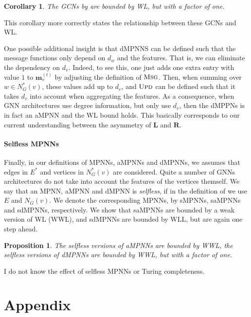 \documentclass[10pt,a4paper]{article}
\newtheorem{proposition}{Proposition}[section]
\newtheorem{corollary}[theorem]{Corollary}
\theoremstyle{definition}
\begin{document}
\begin{corollary}
	The GCNs by \citet{KipfW16} are bounded by WL, but with a factor of one.
\end{corollary}
This corollary more correctly states the relationship between these GCNs and WL.




\smallskip
\noindent
\leftpointright
One possible additional insight is that dMPNNS can be defined such that
the message functions  only depend on $d_w$ and the features. That is, we 
can eliminate the dependency on $d_v$.
Indeed, to see this, one just adds one extra entry with value $1$ to $\mathbf{m}_v^{(t)}$ by adjusting the definition of $\textsc{Msg}$. Then, when summing over
$w\in N_G^*(v)$, these values add up to $d_v$, and $\textsc{Upd}$ can be defined such that it takes $d_v$ into account when aggregating the features. 
As a consequence, when GNN architectures use degree information, but only use $d_v$, then the dMPPNs is in fact an aMPNN and the WL bound holds. This basically corresponds to our current understanding between the asymmetry of $\mathbf{L}$ and $\mathbf{R}$. 



\paragraph{Selfless MPNNs} Finally, in our definitions of MPNNs, aMPNNs and dMPNNs, we assumes that edges in $E^*$
and vertices in $N_G^*(v)$ are considered. Quite a number of GNNs architectures do not take into account the features of the vertices themself. We say that an MPNN, aMPNN and dMPNN is \textit{selfless}, if in the definition of we use $E$ and $N_G(v)$. We denote the corresponding MPNNs, by sMPNNs, saMPNNs and sdMPNNs, respectively. We show that saMPNNs are bounded by a weak version of WL (WWL), and sdMPNNs are bounded by WLL, but are again one step ahead.

\begin{proposition}
The selfless versions of aMPNNs are bounded by WWL, the selfless versions of dMPNNs are bounded by WWL, but with a factor of one.
\end{proposition}

\smallskip
\noindent
\leftpointright I do not know the effect of selfless MPNNs or Turing completeness.




\appendix
\section{Appendix}
\end{document}
